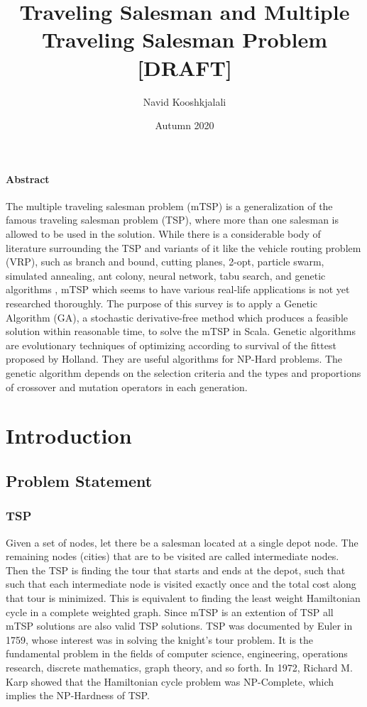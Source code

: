 \documentclass[11pt]{article}
\title{Traveling Salesman and Multiple Traveling Salesman Problem [DRAFT]}
\author{Navid Kooshkjalali}
\date{Autumn 2020}
\begin{document}
\maketitle
\vspace*{2cm}
\paragraph{Abstract}
The multiple traveling salesman problem (mTSP) is a generalization of the famous traveling salesman problem (TSP), where more than one salesman is allowed to be used in the solution. While there is a considerable body of literature surrounding the TSP and variants of it like the vehicle routing problem (VRP), such as branch and bound\cite{branchnbound}, cutting planes\cite{cuttingplanes}, 2-opt\cite{twoopt}, particle swarm\cite{pswarm}, simulated annealing\cite{annealing}, ant colony\cite{ant1, ant2}, neural network\cite{nn}, tabu search\cite{tabu}, and genetic algorithms \cite{holland75, ga1, ga2, ga3}, mTSP which seems to have various real-life applications is not yet researched thoroughly. The purpose of this survey is to apply a Genetic Algorithm (GA), a stochastic derivative-free method which produces a feasible solution within reasonable time, to solve the mTSP in Scala. Genetic algorithms are evolutionary techniques of optimizing according to survival of the fittest proposed by Holland\cite{holland75}. They are useful algorithms for NP-Hard problems. The genetic algorithm depends on the selection criteria and the types and proportions of crossover and mutation operators in each generation.
\newpage
\section{Introduction}
\subsection{Problem Statement}

\subsubsection{TSP}
Given a set of nodes, let there be a salesman located at a single depot node. The remaining nodes (cities) that are to be visited are called intermediate nodes. Then the TSP is finding the tour that starts and ends at the depot, such that such that each intermediate node is visited exactly once and the total cost along that tour is minimized. This is equivalent to finding the least weight Hamiltonian cycle in a complete weighted graph. Since mTSP is an extention of TSP all mTSP solutions are also valid TSP solutions. TSP was documented by Euler in 1759, whose interest was in solving the knight's tour problem. It is the fundamental problem in the fields of computer science, engineering, operations research, discrete mathematics, graph theory, and so forth. In 1972, Richard M. Karp showed that the Hamiltonian cycle problem was NP-Complete\cite{karp72}, which implies the NP-Hardness of TSP.
\end{document}
